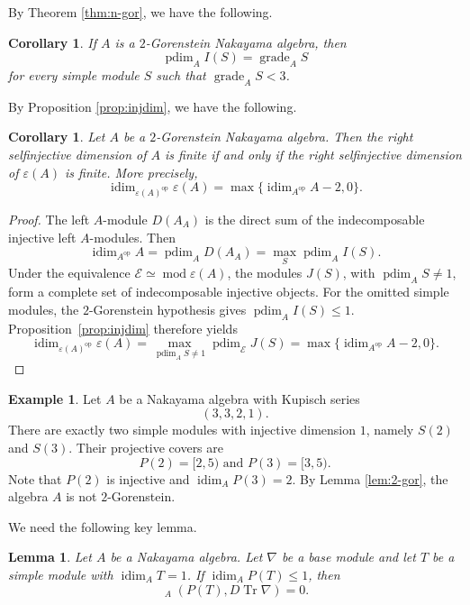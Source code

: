 \documentclass[a4paper,reqno]{amsart}
\numberwithin{equation}{section}
\theoremstyle{plain}
\newtheorem{cor}[thm]{Corollary}
\newtheorem{lem}[thm]{Lemma}
\theoremstyle{definition}
\newtheorem{exam}[defn]{Example}
\theoremstyle{remark}
\DeclareMathOperator{\oHom}{\overline{Hom}}
\renewcommand{\mod}{\operatorname{mod}}
\DeclareMathOperator{\grade}{grade}
\DeclareMathOperator{\pdim}{pdim}
\DeclareMathOperator{\idim}{idim}
\DeclareMathOperator{\op}{op}
\DeclareMathOperator{\Tr}{Tr}
\renewcommand{\-}{\mbox{-}}
\newcommand{\scE}{\mathcal{E}}
\begin{document}
By Theorem \ref{thm:n-gor}, we have the following.


\begin{cor} \label{cor:s3}
If \(A\) is a \(2\)-Gorenstein Nakayama algebra, then 
    \[\pdim_AI(S)=\grade_AS\]
for every simple module \(S\) such that \(\grade_AS<3\).
\end{cor}


By Proposition \ref{prop:injdim}, we have the following.

\begin{cor} \label{cor:selfinjdim}
Let \(A\) be a \(2\)-Gorenstein Nakayama algebra.
Then the right selfinjective dimension of $A$ is finite if and only if the right
selfinjective dimension of $\varepsilon(A)$ is finite. More precisely,
\begin{equation*}
    \idim_{\varepsilon(A)^{\op}}\varepsilon(A)
    =\max\{\idim_{A^{\op}}A-2,0\}.
\end{equation*}
\end{cor}

\begin{proof}
The left $A$-module $D(A_A)$ is the direct sum of the indecomposable injective
left $A$-modules. Then
\[
  \idim_{A^{\op}}A=\pdim_A D(A_A)=\max_S\pdim_A I(S).
\]
Under the equivalence $\scE\simeq\mod\varepsilon(A)$, the modules $J(S)$,
with $\pdim_AS\neq1$, form a complete set of indecomposable injective objects.
For the omitted simple modules, the $2$-Gorenstein hypothesis gives
$\pdim_AI(S)\leq1$. Proposition~\ref{prop:injdim} therefore yields
\[
  \idim_{\varepsilon(A)^{\op}}\varepsilon(A)
  =\max_{\pdim_AS\neq1}\pdim_{\scE}J(S)
  =\max\{\idim_{A^{\op}}A-2,0\}.
\]
\end{proof}


\begin{exam}
Let \(A\) be a Nakayama algebra with Kupisch series 
\[(3,3,2,1).\]
There are exactly two simple modules with injective dimension \(1\), 
namely \(S(2)\) and \(S(3)\).
Their projective covers are
\[P(2)=[2,5) \text{ and }  P(3)=[3,5).\]
Note that \(P(2)\) is injective and \(\idim_AP(3)=2\).
By Lemma \ref{lem:2-gor}, the algebra \(A\) is not \(2\)-Gorenstein.
\end{exam}

We need the following key lemma.

\begin{lem}\label{lem:uniserial-observation}
Let \(A\) be a  Nakayama algebra.
Let \(\nabla\) be a base module and 
let \(T\) be a simple module with \(\idim_AT=1\).  
If \(\idim_AP(T)\le 1\), then
\[
  \oHom_A(P(T),D\Tr\nabla)=0.
\]\end{lem}
\end{document}
